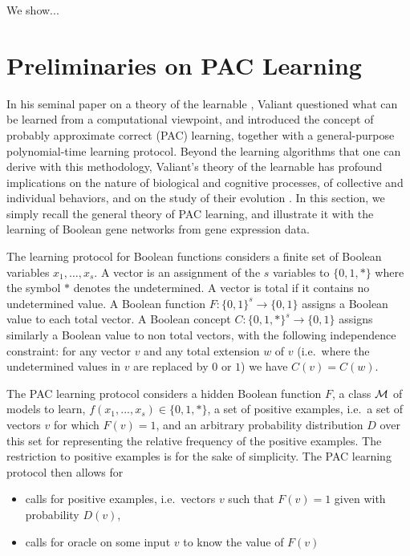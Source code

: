 \documentclass{llncs}
\begin{document}
We show...

\section{Preliminaries on PAC Learning}\label{pac}

In his seminal paper on a theory of the learnable \cite{Valiant84cacm},
Valiant questioned what can be learned from a computational viewpoint,
and introduced the concept of probably approximate correct (PAC) learning,
together with a general-purpose polynomial-time learning protocol.
Beyond the learning algorithms that one can derive with this methodology,
Valiant's theory of the learnable has profound implications
on the nature of biological and cognitive processes,
of collective and individual behaviors,
and on the study of their evolution \cite{Valiant13book}.
In this section, we simply recall the general theory of PAC learning,
and illustrate it with the learning of Boolean gene networks from gene expression data.

The learning protocol for Boolean functions considers
a finite set of Boolean variables $x_1,\ldots,x_s$.
A vector is an assignment of the $s$ variables to $\{0,1,*\}$
where the symbol $*$ denotes the undetermined.
A vector is total if it contains no undetermined value.
A Boolean function $F:\{0,1\}^s \rightarrow\{0,1\}$
assigns a Boolean value to each total vector.
A Boolean concept $C:\{0,1,*\}^s \rightarrow\{0,1\}$
assigns similarly a Boolean value to non total vectors,
with the following independence constraint:
for any vector $v$ and any total extension $w$ of $v$ (i.e.~where the undetermined values in $v$ are replaced by $0$ or $1$)
we have $C(v)=C(w)$.

The PAC learning protocol considers a hidden Boolean function $F$,
a class $\cal M$ of models to learn, $f(x_1,...,x_s) \in \{0,1,*\}$,
a set of positive examples, i.e.~a set of vectors $v$ for which $F(v)=1$,
and an arbitrary probability distribution $D$ over this set
for representing the relative frequency of the positive examples.
The restriction to positive examples is for the sake of simplicity.
The PAC learning protocol then allows for
\begin{itemize}
  \item
calls for positive examples, i.e.~vectors $v$ such that $F(v)=1$ given with probability $D(v)$,
  \item
calls for oracle on some input $v$ to know the value of $F(v)$
\end{itemize}
\end{document}
